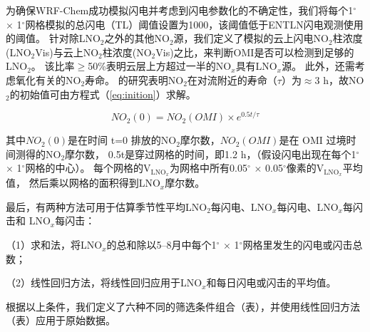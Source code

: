 为确保WRF-Chem成功模拟闪电并考虑到闪电参数化的不确定性，我们将每个1$^{\circ}$ $\times$ 1$^{\circ}$网格模拟的总闪电（TL）阈值设置为1000，该阈值低于ENTLN闪电观测使用的阈值。
针对除LNO$_2$之外的其他NO$_2$源，我们定义了模拟的云上闪电NO$_2$柱浓度(LNO$_2$Vis)与云上NO$_2$柱浓度(NO$_2$Vis)之比，来判断OMI是否可以检测到足够的LNO$_2$。
该比率$\geq$50\%表明云层上方超过一半的NO$_x$具有LNO$_x$源。
此外，还需考虑氧化有关的NO$_2$寿命。
\citet{Nault.2017}的研究表明NO$_2$在对流附近的寿命（$\tau$）为$\approx$3 h，故NO$_2$的初始值可由方程式（\ref{eq:inition}）求解。

\begin{equation} \label{eq:inition}
NO_2(0) = NO_2(OMI) \times e^{0.5t/\tau}
\end{equation}

其中$NO_2(0)$是在时间 t=0 排放的NO$_2$摩尔数，$NO_2(OMI)$是在 OMI 过境时间测得的NO$_2$摩尔数，
0.5t是穿过网格的时间，即1.2 h，（假设闪电出现在每个1$^{\circ}$ $\times$ 1$^{\circ}$网格的中心）。
每个网格的V$_\textrm{LNO$_x$}$为网格中所有0.05$^{\circ}$ $\times$ 0.05$^{\circ}$像素的V$_\textrm{LNO$_x$}$平均值，
然后乘以网格的面积得到LNO$_x$摩尔数。

最后，有两种方法可用于估算季节性平均LNO$_2$每闪电、LNO$_x$每闪电、LNO$_x$每闪击和 LNO$_x$每闪击：

（1）求和法，将LNO$_x$的总和除以5--8月中每个1$^{\circ}$ $\times$ 1$^{\circ}$网格里发生的闪电或闪击总数；

（2）线性回归方法，将线性回归应用于LNO$_x$和每日闪电或闪击的平均值。


根据以上条件，我们定义了六种不同的筛选条件组合（表），并使用线性回归方法（表）应用于原始数据。

